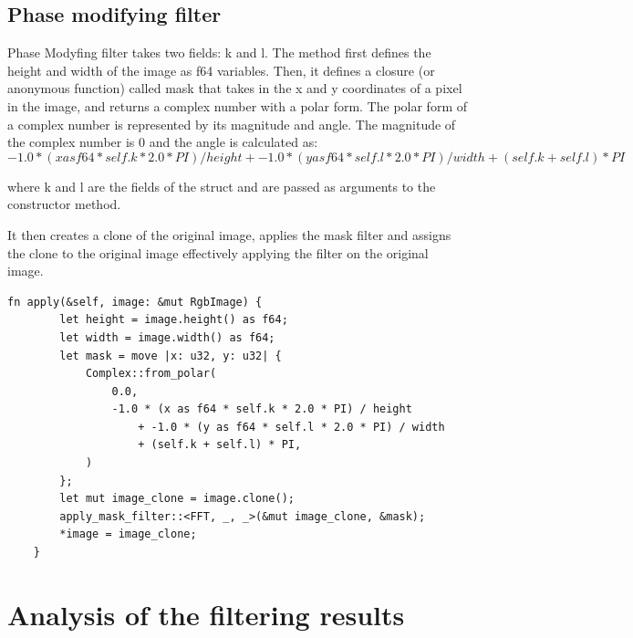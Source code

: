 \documentclass[12pt]{article}
\begin{document}
\subsection{Phase modifying filter}
Phase Modyfing filter takes two fields: k and l. 
The method first defines the height and width of the image as f64 variables. Then, it defines a closure (or anonymous function) called mask that takes in the x and y coordinates of a pixel in the image, and returns a complex number with a polar form. The polar form of a complex number is represented by its magnitude and angle. The magnitude of the complex number is 0 and the angle is calculated as:
\begin{equation}
-1.0 * (x as f64 * self.k * 2.0 * PI) / height + -1.0 * (y as f64 * self.l * 2.0 * PI) / width + (self.k + self.l) * PI
\end{equation}

where k and l are the fields of the struct and are passed as arguments to the constructor method.

It then creates a clone of the original image, applies the mask filter and assigns the clone to the original image effectively applying the filter on the original image.
\begin{lstlisting}
fn apply(&self, image: &mut RgbImage) {
        let height = image.height() as f64;
        let width = image.width() as f64;
        let mask = move |x: u32, y: u32| {
            Complex::from_polar(
                0.0,
                -1.0 * (x as f64 * self.k * 2.0 * PI) / height
                    + -1.0 * (y as f64 * self.l * 2.0 * PI) / width
                    + (self.k + self.l) * PI,
            )
        };
        let mut image_clone = image.clone();
        apply_mask_filter::<FFT, _, _>(&mut image_clone, &mask);
        *image = image_clone;
    }
\end{lstlisting}

\section{Analysis of the filtering results}
\end{document}
